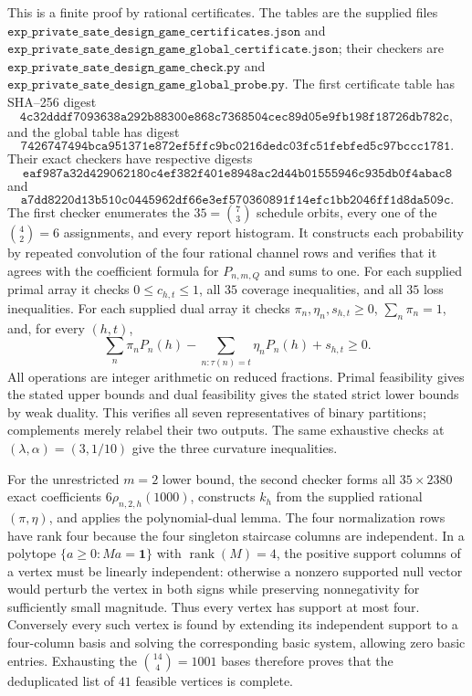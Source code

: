 This is a finite proof by rational certificates.  The tables are the supplied files \(\texttt{exp\_private\_sate\_design\_game\_certificates.json}\) and \(\texttt{exp\_private\_sate\_design\_game\_global\_certificate.json}\); their checkers are \(\texttt{exp\_private\_sate\_design\_game\_check.py}\) and \(\texttt{exp\_private\_sate\_design\_game\_global\_probe.py}\).  The first certificate table has SHA--256 digest
\[
 \texttt{4c32dddf7093638a292b88300e868c7368504cec89d05e9fb198f18726db782c},
\]
and the global table has digest
\[
 \texttt{7426747494bca951371e872ef5ffc9bc0216dedc03fc51febfed5c97bccc1781}.
\]
Their exact checkers have respective digests
\[
 \texttt{eaf987a32d429062180c4ef382f401e8948ac2d44b01555946c935db0f4abac8}
\]
and
\[
 \texttt{a7dd8220d13b510c0445962df66e3ef570360891f14efc1bb2046ff1d8da509c}.
\]
The first checker enumerates the \(35=\binom73\) schedule orbits, every one of the \(\binom42=6\) assignments, and every report histogram.  It constructs each probability by repeated convolution of the four rational channel rows and verifies that it agrees with the coefficient formula for \(P_{n,m,Q}\) and sums to one.  For each supplied primal array it checks \(0\le c_{h,t}\le1\), all \(35\) coverage inequalities, and all \(35\) loss inequalities.  For each supplied dual array it checks \(\pi_n,\eta_n,s_{h,t}\ge0\), \(\sum_n\pi_n=1\), and, for every \((h,t)\),
\[
 \sum_n\pi_nP_n(h)-\sum_{n:\tau(n)=t}\eta_nP_n(h)+s_{h,t}\ge0.
\]
All operations are integer arithmetic on reduced fractions.  Primal feasibility gives the stated upper bounds and dual feasibility gives the stated strict lower bounds by weak duality.  This verifies all seven representatives of binary partitions; complements merely relabel their two outputs.  The same exhaustive checks at \((\lambda,\alpha)=(3,1/10)\) give the three curvature inequalities.

For the unrestricted \(m=2\) lower bound, the second checker forms all \(35\times2380\) exact coefficients \(6\rho_{n,2,h}(1000)\), constructs \(k_h\) from the supplied rational \((\pi,\eta)\), and applies the polynomial-dual lemma.  The four normalization rows have rank four because the four singleton staircase columns are independent.  In a polytope \(\{a\ge0:Ma=\mathbf1\}\) with \(\operatorname{rank}(M)=4\), the positive support columns of a vertex must be linearly independent: otherwise a nonzero supported null vector would perturb the vertex in both signs while preserving nonnegativity for sufficiently small magnitude.  Thus every vertex has support at most four.  Conversely every such vertex is found by extending its independent support to a four-column basis and solving the corresponding basic system, allowing zero basic entries.  Exhausting the \(\binom{14}{4}=1001\) bases therefore proves that the deduplicated list of \(41\) feasible vertices is complete.

